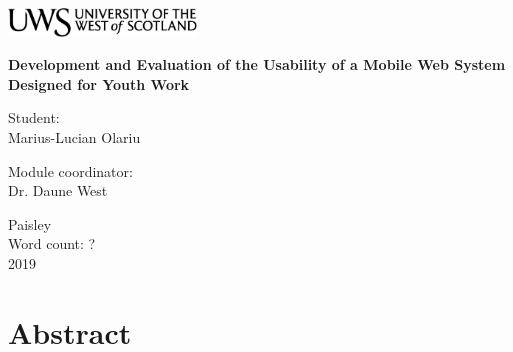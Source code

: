 \documentclass[version=last,fontsize=13pt]{scrartcl}
\begin{document}
\begin{titlepage}
	\begin{center}	
		\includegraphics[width = 5cm,height = 1.5cm]{./imgs/uws_logo.png}\\[5cm]

	{ \huge \bfseries %
		Development and Evaluation of the Usability of a Mobile Web System Designed for Youth Work\\ \Large}

	\vspace{2cm}
	
	\vspace{2cm}			
			

			
		\begin{flushright}
				\large Student:\\
				Marius-Lucian Olariu\\[1cm]
		\end{flushright}
		
	
		\begin{flushleft}
			 \large
				Module coordinator: \\
				Dr. Daune West \\[1cm]
		\end{flushleft}
		
	\vspace{2cm}	
	
		
		\vfill

			{\large {Paisley \\ Word count: ? \\ 2019}}
		\end{center}
\end{titlepage}

\renewcommand{\labelenumi}{\roman{enumi}}

\newpage

\tableofcontents

\newpage



\section{Abstract}%
\end{document}
